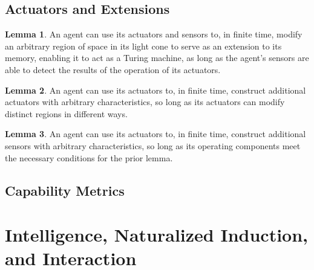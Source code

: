 \documentclass[12pt]{article}
\theoremstyle{definition}
\newtheorem{lem}{Lemma}
\begin{document}

\subsection{Actuators and Extensions}
\label{sec:action}

\begin{lem}

   An agent can use its actuators and sensors to, in finite time, modify an
   arbitrary region of space in its light cone to serve as an extension to its
   memory, enabling it to act as a Turing machine, as long as the agent's
   sensors are able to detect the results of the operation of its actuators.

\end{lem}

\begin{lem}

   An agent can use its actuators to, in finite time, construct additional
   actuators with arbitrary characteristics, so long as its actuators can
   modify distinct regions in different ways.

\end{lem}

\begin{lem}

   An agent can use its actuators to, in finite time, construct additional
   sensors with arbitrary characteristics, so long as its operating components
   meet the necessary conditions for the prior lemma.

\end{lem}

\subsection{Capability Metrics}
\label{sec:metrics}


\section{Intelligence, Naturalized Induction, and Interaction}
\label{sec:intelligence}

\end{document}
